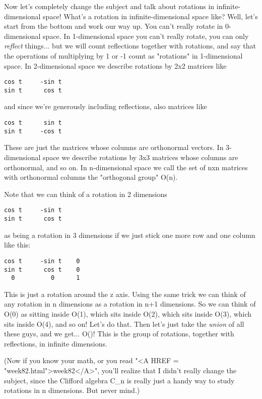 Now let's completely change the subject and talk about rotations
in infinite-dimensional space!  What's a rotation in infinite-dimensional 
space like?  Well, let's start from the bottom and work our way up.
You can't really rotate in 0-dimensional space.  In 1-dimensional
space you can't really rotate, you can only \emph{reflect} things... but we
will count reflections together with rotations, and say that the
operations of multiplying by 1 or -1 count as "rotations" in
1-dimensional space.  In 2-dimensional space we describe rotations by
2x2 matrices like

\begin{verbatim}
cos t     -sin t
sin t      cos t
\end{verbatim}
    
and since we're generously including reflections, also matrices like

\begin{verbatim}
cos t      sin t
sin t     -cos t
\end{verbatim}
    
These are just the matrices whose columns are orthonormal vectors.  In
3-dimensional space we describe rotations by 3x3 matrices whose
columns are orthonormal, and so on.  In n-dimensional space we call
the set of nxn matrices with orthonormal columns the "orthogonal
group" O(n).  

Note that we can think of a rotation in 2 dimensions

\begin{verbatim}
cos t     -sin t
sin t      cos t
\end{verbatim}
    
as being a rotation in 3 dimensions if we just stick one more row and one
column like this:

\begin{verbatim}
cos t     -sin t    0
sin t      cos t    0
  0          0      1
\end{verbatim}
    
This is just a rotation around the z axis.  Using the same trick
we can think of any rotation in n dimensions as a rotation in n+1
dimensions.  So we can think of O(0) as sitting inside O(1), which
sits inside O(2), which sits inside O(3), which sits inside O(4),
and so on!  Let's do that.  Then let's just take the \emph{union} of
all these guys, and we get... O(\infty )!  This is the group of
rotations, together with reflections, in infinite dimensions.

(Now if you know your math, or you read "<A HREF = "week82.html">week82</A>", you'll realize that I
didn't really change the subject, since the Clifford algebra C_{n} is
really just a handy way to study rotations in n dimensions.  But never
mind.)  


